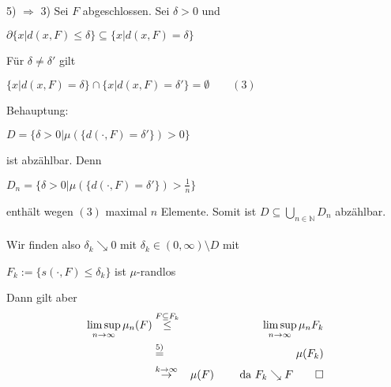 \documentclass[10pt,a4paper]{report}
\newcommand{\N}{\mathbb{N}}
\begin{document}
5) $\Rightarrow$ 3) Sei $F$ abgeschlossen. Sei $\delta > 0$ und
\begin{center}
$\partial\{x|d(x,F)\leq \delta\} \subseteq \{x|d(x,F)=\delta\}$
\end{center}
Für $\delta\neq \delta'$ gilt
\begin{center}
$\{x|d(x,F)=\delta\}\cap \{x|d(x,F)=\delta'\}=\emptyset \qquad (3)$
\end{center}
Behauptung:
\begin{center}
$D=\{\delta > 0|\mu(\{d(\cdot,F)=\delta'\})>0\}$
\end{center}
ist abzählbar. Denn
\begin{center}
$D_n=\{\delta > 0|\mu(\{d(\cdot,F)=\delta'\})>\frac{1}{n}\}$
\end{center}
enthält wegen $(3)$ maximal $n$ Elemente. Somit ist $D \subseteq \bigcup\limits_{n \in \N} D_n$ abzählbar. \\\\
Wir finden also $\delta_k \searrow 0$ mit $\delta_k \in (0,\infty)\setminus D$ mit
\begin{center}
$F_k:=\{s(\cdot,F)\leq \delta_k\}$ ist $\mu$-randlos
\end{center}
Dann gilt aber
\begin{eqnarray*}
\limsup\limits_{n \to \infty} \mu_n(F)&\overset{F\subseteq F_k}{\leq}& \limsup\limits_{n \to \infty} \mu_n{F_k}\\
&\overset{5)}{=}&\mu(F_k)\\
&\overset{k \to \infty}{\to}& \mu(F) \qquad \text{ da } F_k \searrow F \qed
\end{eqnarray*}

\end{document}
